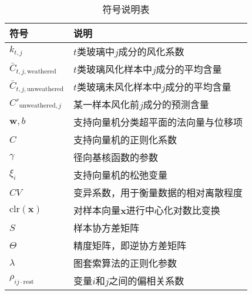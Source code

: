 \begin{table}[H]
    \centering
    \caption{符号说明表}
    \begin{tabular}{ll}
        \toprule
        \textbf{符号} & \textbf{说明} \\
        \midrule
        $k_{t,j}$ & $t$类玻璃中$j$成分的风化系数 \\
        $\bar{C}_{t,j,\text{weathered}}$ & $t$类玻璃风化样本中$j$成分的平均含量 \\
        $\bar{C}_{t,j,\text{unweathered}}$ & $t$类玻璃未风化样本中$j$成分的平均含量 \\
        $C'_{\text{unweathered}, j}$ & 某一样本风化前$j$成分的预测含量 \\
        $\boldsymbol{w}, b$ & 支持向量机分类超平面的法向量与位移项 \\
        $C$ & 支持向量机的正则化系数 \\
        $\gamma$ & 径向基核函数的参数 \\
        $\xi_i$ & 支持向量机的松弛变量 \\
        $CV$ & 变异系数，用于衡量数据的相对离散程度 \\
        $\text{clr}(\boldsymbol{x})$ & 对样本向量$\boldsymbol{x}$进行中心化对数比变换 \\
        $S$ & 样本协方差矩阵 \\
        $\Theta$ & 精度矩阵，即逆协方差矩阵 \\
        $\lambda$ & 图套索算法的正则化参数 \\
        $\rho_{ij \cdot \text{rest}}$ & 变量$i$和$j$之间的偏相关系数 \\
        \bottomrule
    \end{tabular}
\end{table}